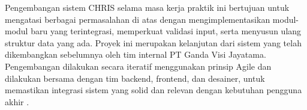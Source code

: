 Pengembangan sistem CHRIS selama masa kerja praktik ini bertujuan untuk mengatasi berbagai permasalahan di atas dengan mengimplementasikan modul-modul baru yang terintegrasi, memperkuat validasi input, serta menyusun ulang struktur data yang ada. Proyek ini merupakan kelanjutan dari sistem yang telah dikembangkan sebelumnya oleh tim internal PT Ganda Visi Jayatama. Pengembangan dilakukan secara iteratif menggunakan prinsip Agile dan dilakukan bersama dengan tim backend, frontend, dan desainer, untuk memastikan integrasi sistem yang solid dan relevan dengan kebutuhan pengguna akhir \cite{jahan2014human, wandhe2020role}.



        
        




